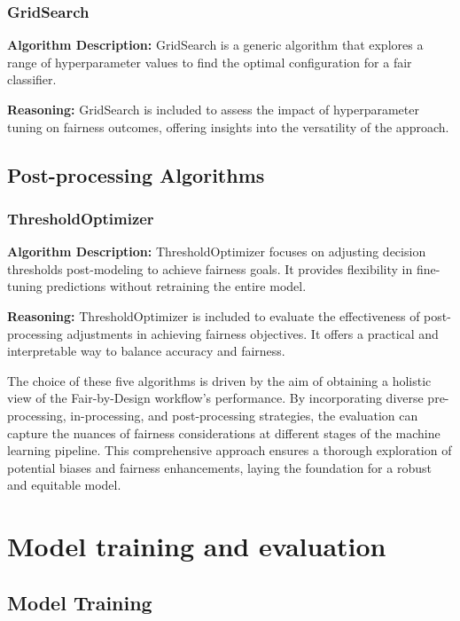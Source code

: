 \subsubsection{GridSearch}

\textbf{Algorithm Description:} GridSearch is a generic algorithm that explores a range of hyperparameter values to find the optimal configuration for a fair classifier.

\textbf{Reasoning:} GridSearch is included to assess the impact of hyperparameter tuning on fairness outcomes, offering insights into the versatility of the approach.

\subsection{Post-processing Algorithms}

\subsubsection{ThresholdOptimizer}

\textbf{Algorithm Description:} ThresholdOptimizer focuses on adjusting decision thresholds post-modeling to achieve fairness goals. It provides flexibility in fine-tuning predictions without retraining the entire model.

\textbf{Reasoning:} ThresholdOptimizer is included to evaluate the effectiveness of post-processing adjustments in achieving fairness objectives. It offers a practical and interpretable way to balance accuracy and fairness.

The choice of these five algorithms is driven by the aim of obtaining a holistic view of the Fair-by-Design workflow's performance. By incorporating diverse pre-processing, in-processing, and post-processing strategies, the evaluation can capture the nuances of fairness considerations at different stages of the machine learning pipeline. This comprehensive approach ensures a thorough exploration of potential biases and fairness enhancements, laying the foundation for a robust and equitable model.

\section{Model training and evaluation}
\label{section:val_mt_eval}

\subsection{Model Training}

